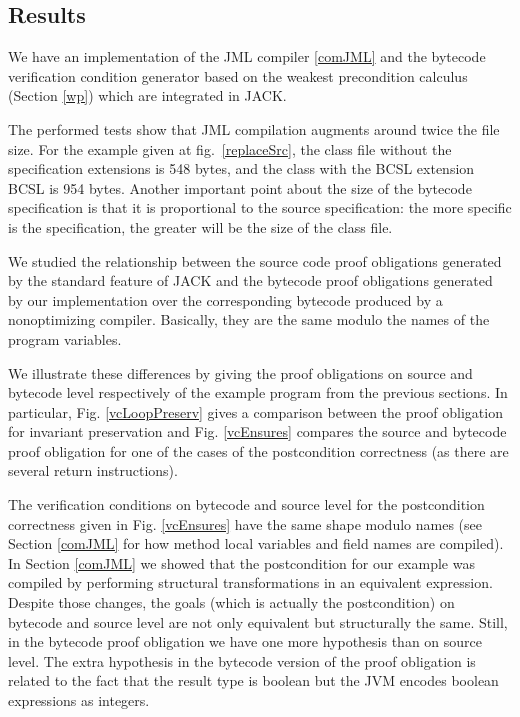 
\subsection{Results}  \label{results}


We have an implementation of the JML compiler \ref{comJML} and the bytecode verification condition generator based on the weakest precondition calculus (Section \ref{wp}) 
which are integrated in JACK. 

The performed tests show that JML compilation augments around twice the file size. 
For the example given at fig.~\ref{replaceSrc}, the class file without the specification extensions is 548 bytes, 
and the class with the BCSL extension BCSL is 954 bytes. 
Another important point about the size of the bytecode specification is that it is proportional to the source specification: 
the more specific is the specification, the greater will be the size of the class file. 


We studied the relationship between the source code proof obligations generated 
by the standard feature of JACK and the bytecode proof obligations generated by our implementation over the corresponding bytecode produced by a nonoptimizing compiler.  
Basically, they are the same modulo the names of the program variables.

 We illustrate these differences by giving the proof obligations on source and bytecode level respectively of the example program from the previous sections. In particular, Fig. \ref{vcLoopPreserv} gives a comparison between the proof obligation for invariant preservation and  Fig. \ref{vcEnsures} compares the source and bytecode proof obligation
 for one of the cases of the postcondition correctness (as there are several return instructions).

The verification conditions on bytecode and source level for the postcondition  correctness given in Fig. \ref{vcEnsures}
 have the same shape modulo names (see Section \ref{comJML} for how method local variables and field names are compiled).
In Section \ref{comJML} we showed that the postcondition for our example was compiled by performing structural transformations 
in an equivalent expression. Despite those changes, the goals (which is actually the postcondition) on bytecode and source level are not only equivalent
but structurally the same. Still, in the bytecode proof obligation we have one more hypothesis than on source level. The extra hypothesis in the bytecode
version of the proof obligation is related to the fact that the result type is boolean but the JVM encodes boolean expressions as integers.

